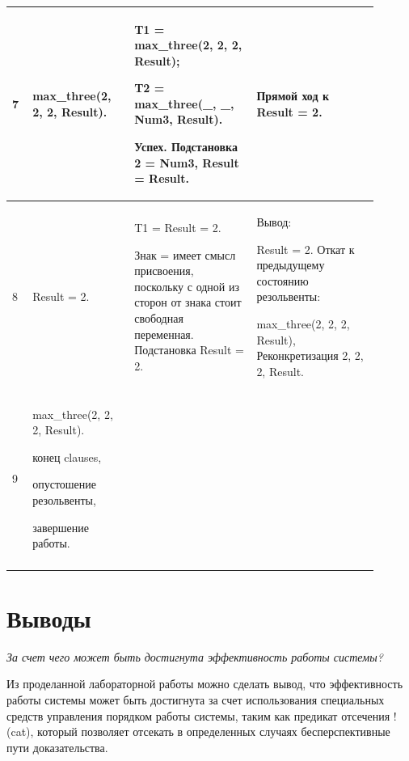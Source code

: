 \documentclass[a4paper,12pt]{article}
\begin{document}
\begin{center}
\begin{longtable}[h!]{|p{0.05\linewidth}|p{0.25\linewidth}|p{ 0.3\linewidth}|p{ 0.3\linewidth}|}
			\hline

			{7} & {max\_three(2, 2, 2, Result).} & {T1 = max\_three(2, 2, 2, Result);

			

		T2 = max\_three(\_, \_, Num3, Result).

	

Успех. Подстановка 2 = Num3, Result = Result.} & {Прямой ход к Result = 2.}\\

			\hline

			{8} & {Result = 2.} & {T1 = Result = 2.

			

		Знак = имеет смысл присвоения, поскольку с одной из сторон от знака стоит свободная переменная. Подстановка Result = 2.} & {Вывод:

	

Result = 2. Откат к предыдущему состоянию резольвенты:

max\_three(2, 2, 2, Result), Реконкретизация 2, 2, 2, Result.}\\

			\hline

			{9} & {max\_three(2, 2, 2, Result).

				

			конец clauses,

		

	опустошение резольвенты,

завершение работы.} & {} & {}\\

			\hline

			\label{m3}

		\end{longtable}

	\end{center}


	\section*{Выводы}

	

	\textit{За счет чего может быть достигнута эффективность работы системы?}

	

	Из проделанной лабораторной работы можно сделать вывод, что эффективность работы системы может быть достигнута за счет использования специальных средств управления порядком работы системы, таким как предикат отсечения ! (cat), который позволяет отсекать в определенных случаях бесперспективные пути доказательства.
\end{document}
